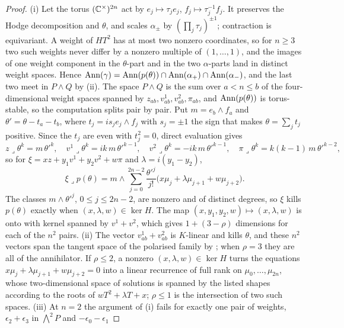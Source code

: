 \begin{proof}
(i) Let the torus $(\mathbb{C}^{\times})^{2n}$ act by $e_{j}\mapsto\tau_{j}e_{j}$,
$f_{j}\mapsto\tau_{j}^{-1}f_{j}$. It preserves the Hodge decomposition and
$\theta$, and scales $\alpha_{\pm}$ by $(\prod_{j}\tau_{j})^{\pm1}$;
contraction is equivariant. A weight of $HT^{2}$ has at most two nonzero
coordinates, so for $n\ge3$ two such weights never differ by a nonzero
multiple of $(1,\dots,1)$, and the images of one weight component in the
$\theta$-part and in the two $\alpha$-parts land in distinct weight spaces.
Hence $\operatorname{Ann}(\gamma)=\operatorname{Ann}(p(\theta))\cap\operatorname{Ann}(\alpha_{+})\cap\operatorname{Ann}(\alpha_{-})$,
and the last two meet in $P\wedge Q$ by (ii). The space
$P\wedge Q$ is the sum over $a<n\le b$ of the four-dimensional weight spaces
spanned by $z_{ab},v^{1}_{ab},v^{2}_{ab},\pi_{ab}$, and $\operatorname{Ann}(p(\theta))$ is
torus-stable, so the computation splits pair by pair. Put
$m=e_{b}\wedge f_{a}$ and $\theta'=\theta-t_{a}-t_{b}$, where
$t_{j}=i s_{j}e_{j}\wedge f_{j}$ with $s_{j}=\pm1$ the sign that makes
$\theta=\sum_{j}t_{j}$ positive. Since the $t_{j}$ are even with
$t_{j}^{2}=0$, direct evaluation gives
\[
  z\lrcorner\theta^{k}=m\,\theta'^{k},\quad
  v^{1}\lrcorner\theta^{k}=ik\,m\,\theta'^{k-1},\quad
  v^{2}\lrcorner\theta^{k}=-ik\,m\,\theta'^{k-1},\quad
  \pi\lrcorner\theta^{k}=k(k-1)\,m\,\theta'^{k-2},
\]
so for $\xi=xz+y_{1}v^{1}+y_{2}v^{2}+w\pi$ and $\lambda=i(y_{1}-y_{2})$,
\[
  \xi\lrcorner p(\theta)=m\wedge\sum_{j=0}^{2n-2}\frac{\theta'^{j}}{j!}
  \bigl(x\mu_{j}+\lambda\mu_{j+1}+w\mu_{j+2}\bigr).
\]
The classes $m\wedge\theta'^{j}$, $0\le j\le2n-2$, are nonzero and of distinct
degrees, so $\xi$ kills $p(\theta)$ exactly when $(x,\lambda,w)\in\ker H$.
The map $(x,y_{1},y_{2},w)\mapsto(x,\lambda,w)$ is onto with kernel spanned by
$v^{1}+v^{2}$, which gives $1+(3-\rho)$ dimensions for each of the $n^{2}$
pairs. (ii) The vector $v^{1}_{ab}+v^{2}_{ab}$ is $K$-linear and kills
$\theta$, and these $n^{2}$ vectors span the tangent space of the polarised
family by \cite[Proposition~9.14]{paperI}; when $\rho=3$ they are all of the
annihilator. If $\rho\le2$, a nonzero $(x,\lambda,w)\in\ker H$ turns the
equations $x\mu_{j}+\lambda\mu_{j+1}+w\mu_{j+2}=0$ into a linear recurrence of
full rank on $\mu_{0},\dots,\mu_{2n}$, whose two-dimensional space of
solutions is spanned by the listed shapes according to the roots of
$wT^{2}+\lambda T+x$; $\rho\le1$ is the intersection of two such spaces.
(iii) At $n=2$ the argument of (i) fails for exactly one pair of weights,
$\epsilon_{2}+\epsilon_{3}$ in $\bigwedge^{2}P$ and $-\epsilon_{0}-\epsilon_{1}$

\end{proof}

